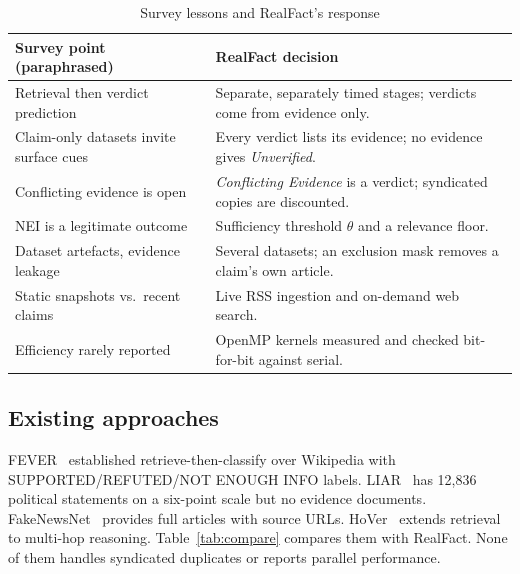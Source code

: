\documentclass[conference,a4paper]{IEEEtran}
\begin{document}
\begin{table}[!t]
\caption{Survey lessons and RealFact's response}
\label{tab:lessons}
\centering\footnotesize
\setlength{\tabcolsep}{3pt}
\renewcommand{\arraystretch}{1.25}
\begin{tabularx}{\columnwidth}{P{0.40\columnwidth}Y}
\toprule
\textbf{Survey point (paraphrased)} & \textbf{RealFact decision}\\
\midrule
Retrieval then verdict prediction & Separate, separately timed stages; verdicts come from evidence only.\\
Claim-only datasets invite surface cues & Every verdict lists its evidence; no evidence gives \emph{Unverified}.\\
Conflicting evidence is open & \emph{Conflicting Evidence} is a verdict; syndicated copies are discounted.\\
NEI is a legitimate outcome & Sufficiency threshold $\theta$ and a relevance floor.\\
Dataset artefacts, evidence leakage & Several datasets; an exclusion mask removes a claim's own article.\\
Static snapshots vs.\ recent claims & Live RSS ingestion and on-demand web search.\\
Efficiency rarely reported & OpenMP kernels measured and checked bit-for-bit against serial.\\
\bottomrule
\end{tabularx}
\end{table}

\subsection{Existing approaches}
FEVER~\cite{fever} established retrieve-then-classify over Wikipedia with SUPPORTED/REFUTED/NOT ENOUGH INFO labels.
LIAR~\cite{liar} has 12,836 political statements on a six-point scale but no evidence documents.
FakeNewsNet~\cite{fakenewsnet} provides full articles with source URLs. HoVer~\cite{hover} extends retrieval to
multi-hop reasoning. Table~\ref{tab:compare} compares them with RealFact. None of them handles syndicated duplicates
or reports parallel performance.
\end{document}
